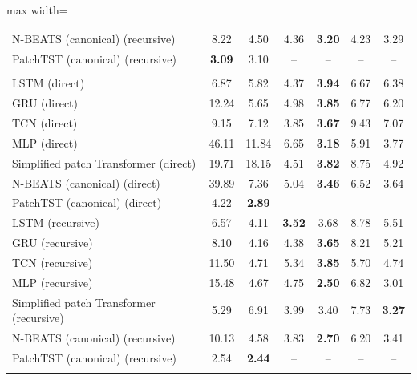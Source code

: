 \begin{table}[htbp]
\begin{adjustbox}{max width=\textwidth}
\begin{tabular}{lcccccc}
N-BEATS (canonical) (recursive) & 8.22 & 4.50 & 4.36 & \textbf{3.20} & 4.23 & 3.29 \\
PatchTST (canonical) (recursive) & \textbf{3.09} & 3.10 & -- & -- & -- & -- \\
\addlinespace
\midrule
\multicolumn{7}{l}{\textit{Panel B: complete-horizon test sample (8 origins, $h=1,\dots,12$)}} \\
\addlinespace
LSTM (direct) & 6.87 & 5.82 & 4.37 & \textbf{3.94} & 6.67 & 6.38 \\
GRU (direct) & 12.24 & 5.65 & 4.98 & \textbf{3.85} & 6.77 & 6.20 \\
TCN (direct) & 9.15 & 7.12 & 3.85 & \textbf{3.67} & 9.43 & 7.07 \\
MLP (direct) & 46.11 & 11.84 & 6.65 & \textbf{3.18} & 5.91 & 3.77 \\
Simplified patch Transformer (direct) & 19.71 & 18.15 & 4.51 & \textbf{3.82} & 8.75 & 4.92 \\
N-BEATS (canonical) (direct) & 39.89 & 7.36 & 5.04 & \textbf{3.46} & 6.52 & 3.64 \\
PatchTST (canonical) (direct) & 4.22 & \textbf{2.89} & -- & -- & -- & -- \\
\addlinespace
LSTM (recursive) & 6.57 & 4.11 & \textbf{3.52} & 3.68 & 8.78 & 5.51 \\
GRU (recursive) & 8.10 & 4.16 & 4.38 & \textbf{3.65} & 8.21 & 5.21 \\
TCN (recursive) & 11.50 & 4.71 & 5.34 & \textbf{3.85} & 5.70 & 4.74 \\
MLP (recursive) & 15.48 & 4.67 & 4.75 & \textbf{2.50} & 6.82 & 3.01 \\
Simplified patch Transformer (recursive) & 5.29 & 6.91 & 3.99 & 3.40 & 7.73 & \textbf{3.27} \\
N-BEATS (canonical) (recursive) & 10.13 & 4.58 & 3.83 & \textbf{2.70} & 6.20 & 3.41 \\
PatchTST (canonical) (recursive) & 2.54 & \textbf{2.44} & -- & -- & -- & -- \\
\addlinespace
\bottomrule
\end{tabular}
\end{adjustbox}
\end{table}
